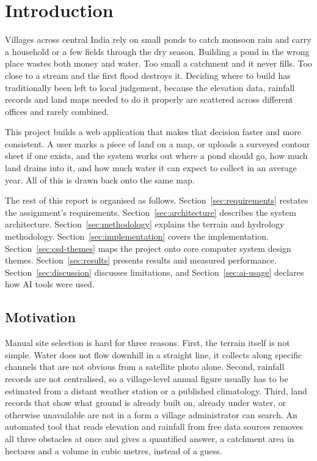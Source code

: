 \documentclass[manuscript,screen,review]{acmart}
\begin{document}
\section{Introduction}
\label{sec:intro}

Villages across central India rely on small ponds to catch monsoon rain and carry a
household or a few fields through the dry season. Building a pond in the wrong place
wastes both money and water. Too small a catchment and it never fills. Too close to a
stream and the first flood destroys it. Deciding where to build has traditionally been
left to local judgement, because the elevation data, rainfall records and land maps
needed to do it properly are scattered across different offices and rarely combined.

This project builds a web application that makes that decision faster and more
consistent. A user marks a piece of land on a map, or uploads a surveyed contour sheet
if one exists, and the system works out where a pond should go, how much land drains
into it, and how much water it can expect to collect in an average year. All of this is
drawn back onto the same map.

The rest of this report is organised as follows. Section~\ref{sec:requirements} restates
the assignment's requirements. Section~\ref{sec:architecture} describes the system
architecture. Section~\ref{sec:methodology} explains the terrain and hydrology
methodology. Section~\ref{sec:implementation} covers the implementation.
Section~\ref{sec:csd-themes} maps the project onto core computer system design themes.
Section~\ref{sec:results} presents results and measured performance.
Section~\ref{sec:discussion} discusses limitations, and Section~\ref{sec:ai-usage}
declares how AI tools were used.

\subsection{Motivation}
Manual site selection is hard for three reasons. First, the terrain itself is not
simple. Water does not flow downhill in a straight line, it collects along specific
channels that are not obvious from a satellite photo alone. Second, rainfall records
are not centralised, so a village-level annual figure usually has to be estimated from
a distant weather station or a published climatology. Third, land records that show
what ground is already built on, already under water, or otherwise unavailable are not
in a form a village administrator can search. An automated tool that reads elevation
and rainfall from free data sources removes all three obstacles at once and gives a
quantified answer, a catchment area in hectares and a volume in cubic metres, instead
of a guess.
\end{document}
